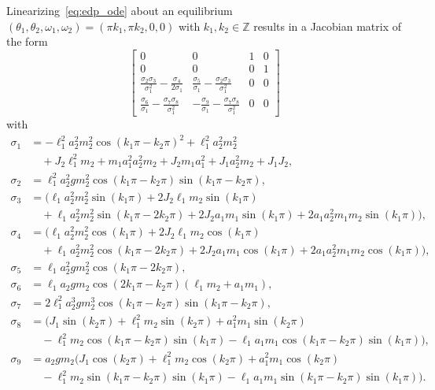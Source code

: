 \documentclass[11pt]{article}
\numberwithin{equation}{section}
\theoremstyle{plain}
\begin{document}
Linearizing~\eqref{eq:edp_ode} about an equilibrium $(\theta_1,\theta_2,\omega_1,\omega_2) = (\pi k_1,\pi k_2,0,0)$ with $k_1,k_2\in\mathbb{Z}$ results in a Jacobian matrix of the form
\begin{equation}\label{DPLinMat}
	\begin{bmatrix}
		0 & 0 & 1 & 0 \\
		0 & 0 & 0 & 1 \\
		\frac{\sigma_2\sigma_3}{\sigma_1^2}-\frac{\sigma_4}{2\sigma_1} & \frac{\sigma_5}{\sigma_1}-\frac{\sigma_2\sigma_3}{\sigma_1^2} & 0 & 0 \\
		\frac{\sigma_6}{\sigma_1}-\frac{\sigma_7\sigma_8}{\sigma_1^2} & -\frac{\sigma_{9}}{\sigma_1}-\frac{\sigma_7\sigma_8}{\sigma_1^2} & 0 & 0
	\end{bmatrix}
\end{equation} 
with 
\begin{equation}
    \begin{split}
        \sigma_1&=- \ell_1^2a_2^2m_2^2\cos(k_1\pi - k_2\pi)^2 + \ell_1^2a_2^2m_2^2 \\
            & \quad + J_2\ell_1^2m_2 + m_1a_1^2a_2^2m_2 + J_2m_1a_1^2 + J_1a_2^2m_2 + J_1J_2, \\
        \sigma_2 &=\ell_1^2 a_2^2 g m_2^2 \cos(k_1\pi - k_2\pi) \sin(k_1\pi - k_2\pi), \\
       \sigma_3 &=(\ell_1 a_2^2 m_2^2 \sin(k_1\pi) + 2 J_2 \ell_1 m_2 \sin(k_1\pi) \\
            &\quad + \ell_1 a_2^2 m_2^2 \sin(k_1\pi - 2 k_2\pi) + 2 J_2 a_1 m_1 \sin(k_1\pi) + 2 a_1 a_2^2 m_1 m_2 \sin(k_1\pi)), \\
        \sigma_4 &=(\ell_1 a_2^2 m_2^2 \cos(k_1\pi) + 2 J_2 \ell_1 m_2 \cos(k_1\pi)\\
            &\quad + \ell_1 a_2^2 m_2^2 \cos(k_1\pi - 2 k_2\pi) + 2 J_2 a_1 m_1 \cos(k_1\pi) + 2 a_1 a_2^2 m_1 m_2 \cos(k_1\pi)),\\
        \sigma_5 &=\ell_1 a_2^2 g m_2^2 \cos(k_1\pi - 2 k_2\pi), \\
        \sigma_6 &=\ell_1 a_2 g m_2 \cos(2 k_1\pi - k_2\pi) (\ell_1 m_2 + a_1 m_1), \\
        \sigma_7 &=2 \ell_1^2 a_2^3 g m_2^3 \cos(k_1\pi - k_2\pi) \sin(k_1\pi - k_2\pi), \\
        \sigma_8 &=(J_1 \sin(k_2\pi) + \ell_1^2 m_2 \sin(k_2\pi) + a_1^2 m_1 \sin(k_2\pi)\\
            &\quad - \ell_1^2 m_2 \cos(k_1\pi - k_2\pi) \sin(k_1\pi) - \ell_1 a_1 m_1 \cos(k_1\pi - k_2\pi) \sin(k_1\pi)), \\
        \sigma_9 &=a_2 g m_2 (J_1 \cos(k_2\pi) + \ell_1^2 m_2 \cos(k_2\pi) + a_1^2 m_1 \cos(k_2\pi) \\
            &\quad - \ell_1^2 m_2 \sin(k_1\pi - k_2\pi) \sin(k_1\pi) - \ell_1 a_1 m_1 \sin(k_1\pi - k_2\pi) \sin(k_1\pi)).
    \end{split}
\end{equation}
\end{document}
